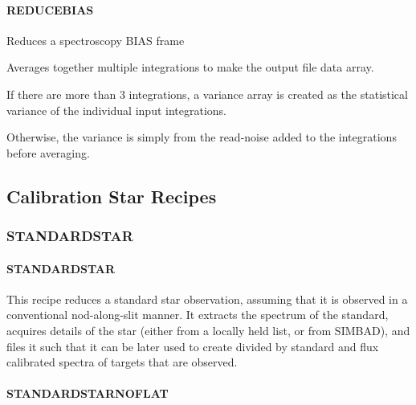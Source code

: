 \documentclass[twoside,11pt]{article}
\renewcommand{\_}{\texttt{\symbol{95}}}
\begin{document}
\paragraph*{\_REDUCE\_BIAS\_\label{_REDUCE_BIAS_}}

Reduces a spectroscopy BIAS frame

\mbox{}

Averages together multiple integrations to make the output file data array.



If there are more than 3 integrations, a variance array is created as the
statistical variance of the individual input integrations.



Otherwise, the variance is simply from the read-noise added to the integrations
before averaging.



\subsection{Calibration Star Recipes}

\subsubsection{STANDARD\_STAR}
\paragraph*{STANDARD\_STAR\label{STANDARD_STAR}}




\mbox{}

This recipe reduces a standard star observation, assuming that it is
observed in a conventional nod-along-slit manner. It extracts the
spectrum of the standard, acquires details of the star (either from a
locally held list, or from SIMBAD), and files it such that it can be
later used to create divided by standard and flux calibrated spectra
of targets that are observed.

\paragraph*{STANDARD\_STAR\_NOFLAT\label{STANDARD_STAR_NOFLAT}}
\end{document}

